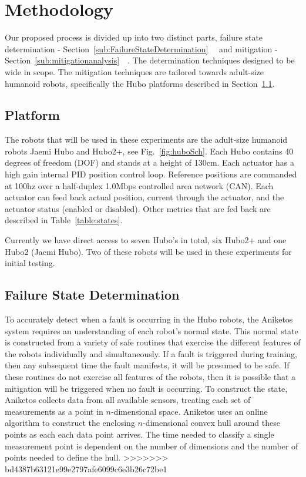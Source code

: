 \section{Methodology}

Our proposed process is divided up into two distinct parts, failure state 
determination - Section~\ref{sub:FailureStateDetermination}~~ and mitigation - Section~\ref{sub:mitigationanalysis}~~.  The determination techniques designed to be 
wide in scope.  The mitigation techniques are tailored towards adult-size
humanoid robots, specifically the Hubo platforms described in Section~\ref{sec:platform}.

 
\subsection{Platform}\label{sec:platform}
The robots that will be used in these experiments are the adult-size 
humanoid robots Jaemi Hubo and Hubo2+, see Fig.~\ref{fig:huboSch}.  
Each Hubo contains 40 degrees of freedom (DOF) and stands at a height of 130cm.
Each actuator has a high gain internal PID position control loop.  Reference positions are
commanded at 100hz over a half-duplex 1.0Mbps controlled area network (CAN).
Each actuator can feed back actual position, current through the actuator, and the actuator status 
(enabled or disabled).  Other metrics that are fed back are described in 
Table~\ref{table:states}.  

Currently we have direct access to seven Hubo's in total, six Hubo2+ and one Hubo2 (Jaemi Hubo).
Two of these robots will be used in these experiments for initial testing.



\subsection{Failure State Determination}
\label{sub:failurestatedetermination}
To accurately detect when a fault is occurring in the Hubo robots, the Aniketos system requires an understanding of each robot's normal state. This normal state is constructed from a variety of safe routines that exercise the different features of the robots individually and simultaneously. If a fault is triggered during training, then any subsequent time the fault manifests, it will be presumed to be safe. If these routines do not exercise all features of the robots, then it is possible that a mitigation will be triggered when no fault is occurring. To construct the state, Aniketos collects data from all available sensors, treating each set of measurements as a point in $n$-dimensional space. Aniketos uses an online algorithm to construct the enclosing $n$-dimensional convex hull around these points as each each data point arrives. The time needed to classify a single measurement point is dependent on the number of dimensions and the number of points needed to define the hull.
>>>>>>> bd4387b63121e99e2797afe6099c6e3b26c72be1

